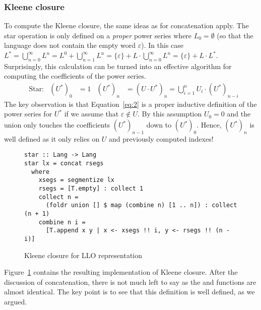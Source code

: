 \subsubsection{Kleene closure}

To compute the Kleene closure, the same ideas as for
concatenation apply. The star operation is only defined on a \emph{proper}
power series where $L_0 = \emptyset$ (so that the language does not
contain the empty word $\varepsilon$). In this case $L^* =
\bigcup_{n=0}^\infty L^n = L^0 + \bigcup_{n=1}^\infty L^n = \{\varepsilon\}
+ L \cdot \bigcup_{n=0}^\infty L^n  =   \{\varepsilon\}
+ L \cdot L^*$. Surprisingly, this calculation can be turned into an
effective algorithm for computing the coefficients of the power series. 
\begin{align}
  \label{eq:2}
  &\text{Star:}
  & (U^*)_0 &= 1
  & (U^*)_n &= (U \cdot U^*)_n = \bigcup_{i=1}^n U_i\cdot (U^*)_{n-i}
\end{align}
The key observation is that Equation~\eqref{eq:2} is a proper
inductive definition of the power series for $U^*$ if we assume that
$\varepsilon \notin U$. By this assumption $U_0 = 0$ and the union
only touches the coefficients $(U^*)_{n-1}$ down to $(U^*)_0$. Hence, $(U^*)_n$ is well
defined as it only relies on $U$ and previously computed indexes!

\begin{figure}[tp]
\begin{lstlisting}
star :: Lang -> Lang
star lx = concat rsegs
  where
    xsegs = segmentize lx
    rsegs = [T.empty] : collect 1
    collect n =
      (foldr union [] $ map (combine n) [1 .. n]) : collect (n + 1)
    combine n i =
      [T.append x y | x <- xsegs !! i, y <- rsegs !! (n - i)]
\end{lstlisting}
  \caption{Kleene closure for LLO representation}
  \label{fig:star-with-segments}
\end{figure}
Figure~\ref{fig:star-with-segments} contains the resulting implementation of Kleene closure.
After the discussion of concatenation, there is not much left to say
as the  and  functions are almost
identical. The key point is to see that this definition is well
defined, as we argued.

